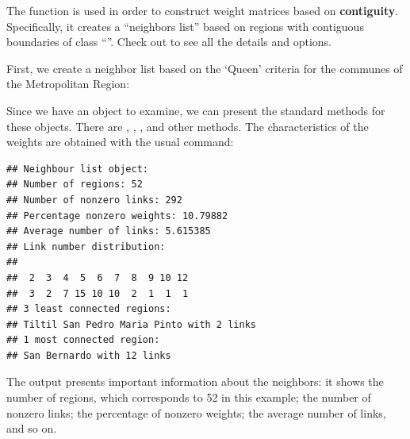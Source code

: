 The function  is used in order to construct weight matrices based on \textbf{contiguity}. Specifically, it creates a ``neighbors list'' based on regions with contiguous boundaries of class ``''. Check out  to see all the details and options. 

First, we create a neighbor list based on the `Queen' criteria for the communes of the Metropolitan Region:

\begin{knitrout}
\color{fgcolor}\begin{kframe}
\begin{alltt}
\hlstd{(}\hlstd{)}
 \hlkwb{<-} \hlstd{(} \hlstd{),}  \hlstd{=}  \hlstd{,}  \hlopt{$}
\end{alltt}
\end{kframe}
\end{knitrout}

Since we have an  object to examine, we can present the standard methods for these objects. There are , , , and other methods. The characteristics of the weights are obtained with the usual  command:

\begin{knitrout}
\color{fgcolor}\begin{kframe}
\begin{alltt}
\end{alltt}
\begin{verbatim}
## Neighbour list object:
## Number of regions: 52 
## Number of nonzero links: 292 
## Percentage nonzero weights: 10.79882 
## Average number of links: 5.615385 
## Link number distribution:
## 
##  2  3  4  5  6  7  8  9 10 12 
##  3  2  7 15 10 10  2  1  1  1 
## 3 least connected regions:
## Tiltil San Pedro Maria Pinto with 2 links
## 1 most connected region:
## San Bernardo with 12 links
\end{verbatim}
\end{kframe}
\end{knitrout}

The output presents important information about the neighbors: it shows the number of regions, which corresponds to 52 in this example; the number of nonzero links; the percentage of nonzero weights; the average number of links, and so on. 

